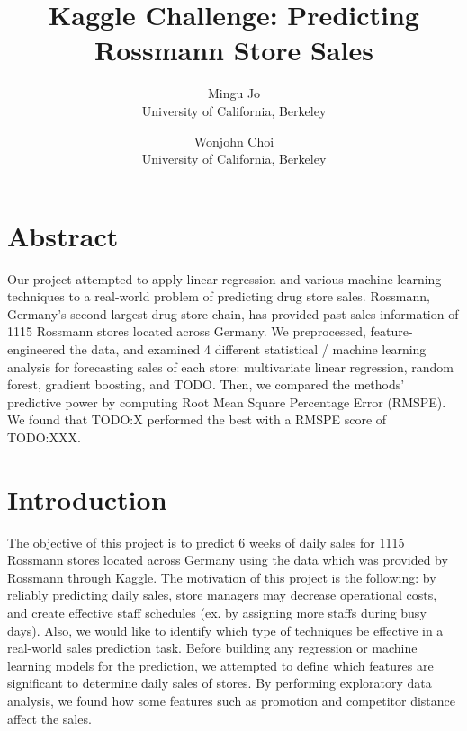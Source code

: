 \documentclass[letterpaper,twocolumn,10pt]{article}
\begin{document}
\date{}

\title{\Large \bf Kaggle Challenge: Predicting Rossmann Store Sales}

\author{
  {\rm Mingu Jo}\\
  University of California, Berkeley
  \and
      {\rm Wonjohn Choi}\\
      University of California, Berkeley
} %

\maketitle

\thispagestyle{empty}


\section{Abstract}
Our project attempted to apply linear regression and various machine learning techniques to a real-world problem of predicting drug store sales. Rossmann, Germany's second-largest drug store chain, has provided past sales information of 1115 Rossmann stores located across Germany. We preprocessed, feature-engineered the data, and examined 4 different statistical / machine learning analysis for forecasting sales of each store: multivariate linear regression, random forest, gradient boosting, and TODO. Then, we compared the methods' predictive power by computing Root Mean Square Percentage Error (RMSPE). We found that TODO:X performed the best with a RMSPE score of TODO:XXX.

\section{Introduction}
The objective of this project is to predict 6 weeks of daily sales for 1115 Rossmann stores located across Germany using the data which was provided by Rossmann through Kaggle. The motivation of this project is the following: by reliably predicting daily sales, store managers may decrease operational costs, and create effective staff schedules (ex. by assigning more staffs during busy days). Also, we would like to identify which type of techniques be effective in a real-world sales prediction task. Before building any regression or machine learning models for the prediction, we attempted to define which features are significant to determine daily sales of stores. By performing exploratory data analysis, we found how some features such as promotion and competitor distance affect the sales. %
\end{document}
